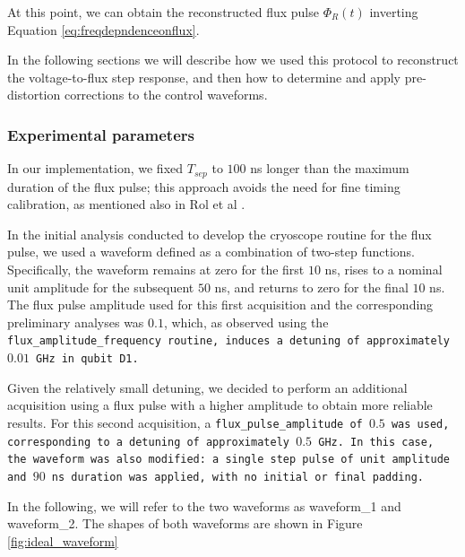 At this point, we can obtain the reconstructed flux pulse $\Phi_R(t)$ inverting Equation \ref{eq:freqdepndenceonflux}.

In the following sections we will describe how we used this protocol to reconstruct the voltage-to-flux step response, and then how to determine and apply pre-distortion corrections to the control waveforms.

\subsubsection{Experimental parameters}
In our implementation, we fixed $T_{sep}$ to $100$ ns longer than the maximum duration of the flux pulse; this approach avoids the need for fine timing calibration, as mentioned also in Rol et al \cite{rol_time-domain_2020}.

In the initial analysis conducted to develop the cryoscope routine for the flux pulse, we used a waveform defined as a combination of two-step functions. 
Specifically, the waveform remains at zero for the first $10$ ns, rises to a nominal unit amplitude for the subsequent $50$ ns, and returns to zero for the final $10$ ns.
The flux pulse amplitude used for this first acquisition and the corresponding preliminary analyses was $0.1$, which, as observed using the \tt{flux\_amplitude\_frequency} routine, induces a detuning of approximately $0.01$ GHz in qubit \tt{D1}. 

Given the relatively small detuning, we decided to perform an additional acquisition using a flux pulse with a higher amplitude to obtain more reliable results.
For this second acquisition, a \tt{flux\_pulse\_amplitude} of $0.5$ was used, corresponding to a detuning of approximately $0.5$ GHz. 
In this case, the waveform was also modified: a single step pulse of unit amplitude and $90$ ns duration was applied, with no initial or final padding.

In the following, we will refer to the two waveforms as waveform\_1 and waveform\_2. 
The shapes of both waveforms are shown in Figure \ref{fig:ideal_waveform}


